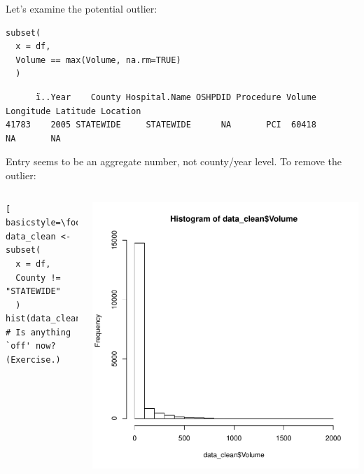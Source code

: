 \begin{frame}
Let's examine the potential outlier:
  \begin{lstlisting}
subset(
  x = df, 
  Volume == max(Volume, na.rm=TRUE)
  )
  \end{lstlisting}
{ \tiny
\begin{verbatim}
      ï..Year    County Hospital.Name OSHPDID Procedure Volume Longitude Latitude Location
41783    2005 STATEWIDE     STATEWIDE      NA       PCI  60418        NA       NA         
\end{verbatim}
}

\newpage

Entry seems to be an aggregate number, not county/year level.  To remove the outlier:

    \begin{columns}
  \begin{lstlisting}[ basicstyle=\footnotesize]
data_clean <- subset(
  x = df, 
  County != "STATEWIDE"
  )
hist(data_clean$Volume)
# Is anything `off' now? (Exercise.)
  \end{lstlisting}

    \begin{center}
       \includegraphics[scale=0.3]{images/histogram2.pdf}
    \end{center}   
\end{columns}

\end{frame}

